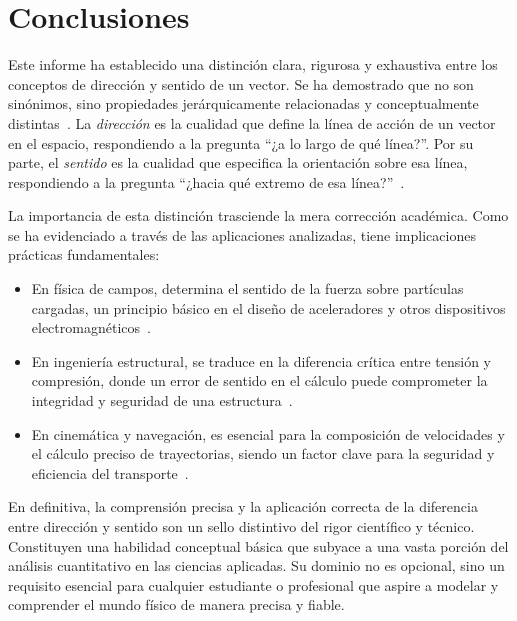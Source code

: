 \documentclass[12pt,a4paper]{article}
\begin{document}
\section{Conclusiones} \label{sec:conclusiones}

Este informe ha establecido una distinción clara, rigurosa y exhaustiva entre los conceptos de dirección y sentido de un vector. Se ha demostrado que no son sinónimos, sino propiedades jerárquicamente relacionadas y conceptualmente distintas~\cite{wikipedia_vector}. La \emph{dirección} es la cualidad que define la línea de acción de un vector en el espacio, respondiendo a la pregunta ``¿a lo largo de qué línea?''. Por su parte, el \emph{sentido} es la cualidad que especifica la orientación sobre esa línea, respondiendo a la pregunta ``¿hacia qué extremo de esa línea?''~\cite{wikipedia_vector}.

La importancia de esta distinción trasciende la mera corrección académica. Como se ha evidenciado a través de las aplicaciones analizadas, tiene implicaciones prácticas fundamentales:

\begin{itemize}
\item En física de campos, determina el sentido de la fuerza sobre partículas cargadas, un principio básico en el diseño de aceleradores y otros dispositivos electromagnéticos~\cite{bariloche_web}.

\item En ingeniería estructural, se traduce en la diferencia crítica entre tensión y compresión, donde un error de sentido en el cálculo puede comprometer la integridad y seguridad de una estructura~\cite{scribd_aplicaciones}.

\item En cinemática y navegación, es esencial para la composición de velocidades y el cálculo preciso de trayectorias, siendo un factor clave para la seguridad y eficiencia del transporte~\cite{serway2008}.
\end{itemize}

En definitiva, la comprensión precisa y la aplicación correcta de la diferencia entre dirección y sentido son un sello distintivo del rigor científico y técnico. Constituyen una habilidad conceptual básica que subyace a una vasta porción del análisis cuantitativo en las ciencias aplicadas. Su dominio no es opcional, sino un requisito esencial para cualquier estudiante o profesional que aspire a modelar y comprender el mundo físico de manera precisa y fiable.
\end{document}
